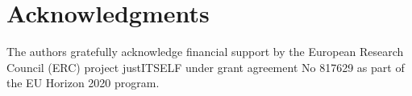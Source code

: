 
\section*{Acknowledgments}

The authors gratefully acknowledge financial support by the European Research Council (ERC) project justITSELF under grant agreement No 817629 as part of the EU Horizon 2020 program.
